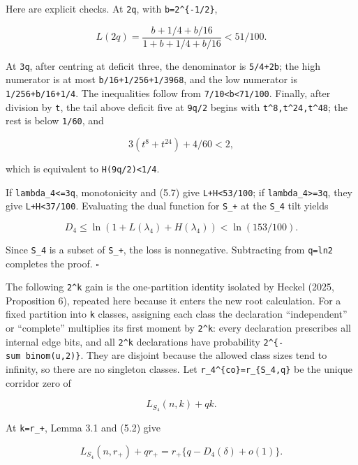 \documentclass[
  11pt,
  a4paper,
]{article}
\begin{document}
Here are explicit checks. At \texttt{2q}, with \texttt{b=2\^{}\{-1/2\}},

\[
 L(2q)=\frac{b+1/4+b/16}{1+b+1/4+b/16}<51/100.
\]

At \texttt{3q}, after centring at deficit three, the denominator is
\texttt{5/4+2b}; the high numerator is at most
\texttt{b/16+1/256+1/3968}, and the low numerator is
\texttt{1/256+b/16+1/4}. The inequalities follow from
\texttt{7/10\textless{}b\textless{}71/100}. Finally, after division by
\texttt{t}, the tail above deficit five at \texttt{9q/2} begins with
\texttt{t\^{}8,t\^{}24,t\^{}48}; the rest is below \texttt{1/60}, and

\[
 3(t^8+t^{24})+4/60<2,                                  \tag{5.8}
\]

which is equivalent to \texttt{H(9q/2)\textless{}1/4}.

If \texttt{lambda\_4\textless{}=3q}, monotonicity and (5.7) give
\texttt{L+H\textless{}53/100}; if \texttt{lambda\_4\textgreater{}=3q},
they give \texttt{L+H\textless{}37/100}. Evaluating the dual function
for \texttt{S\_+} at the \texttt{S\_4} tilt yields

\[
 D_4\le\ln(1+L(\lambda_4)+H(\lambda_4))<\ln(153/100).
\]

Since \texttt{S\_4} is a subset of \texttt{S\_+}, the loss is
nonnegative. Subtracting from \texttt{q=ln2} completes the proof.
\(\square\)

The following \texttt{2\^{}k} gain is the one-partition identity
isolated by Heckel (2025, Proposition 6), repeated here because it
enters the new root calculation. For a fixed partition into \texttt{k}
classes, assigning each class the declaration ``independent'' or
``complete'' multiplies its first moment by \texttt{2\^{}k}: every
declaration prescribes all internal edge bits, and all \texttt{2\^{}k}
declarations have probability
\texttt{2\^{}\{-sum\ binom(u,}\allowbreak{}\texttt{2)}\allowbreak{}\texttt{\}}.
They are disjoint because the allowed class sizes tend to infinity, so
there are no singleton classes. Let
\texttt{r\_}\allowbreak{}\texttt{4\^{}\{co\}=}\allowbreak{}\texttt{r\_}\allowbreak{}\texttt{\{S\_}\allowbreak{}\texttt{4,}\allowbreak{}\texttt{q\}}
be the unique corridor zero of

\[
 L_{S_4}(n,k)+qk.                                       \tag{5.9}
\]

At \texttt{k=r\_+}, Lemma 3.1 and (5.2) give

\[
 L_{S_4}(n,r_+)+qr_+
 =r_+\{q-D_4(\delta)+o(1)\}.                             \tag{5.10}
\]
\end{document}
